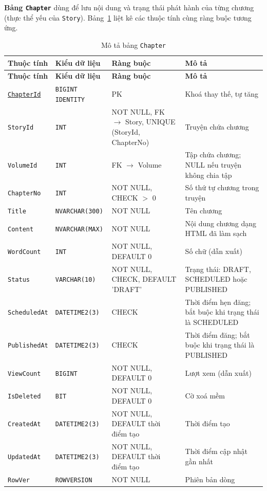 \textbf{Bảng \texttt{Chapter}} dùng để lưu nội dung và trạng thái phát hành của từng chương (thực thể yếu của \texttt{Story}). Bảng~\ref{tab:db-chapter} liệt kê các thuộc tính cùng ràng buộc tương ứng.


{\small
\renewcommand{\arraystretch}{1.2}
\begin{longtable}{|>{\raggedright\arraybackslash}p{3.1cm}|>{\raggedright\arraybackslash}p{2.7cm}|>{\raggedright\arraybackslash}p{4.0cm}|>{\raggedright\arraybackslash}p{5.4cm}|}
\caption{Mô tả bảng \texttt{Chapter}}\label{tab:db-chapter}\\
\hline
\textbf{Thuộc tính} & \textbf{Kiểu dữ liệu} & \textbf{Ràng buộc} & \textbf{Mô tả} \\ \hline
\endfirsthead
\hline
\textbf{Thuộc tính} & \textbf{Kiểu dữ liệu} & \textbf{Ràng buộc} & \textbf{Mô tả} \\ \hline
\endhead
\underline{\texttt{ChapterId}} & \texttt{BIGINT IDENTITY} & PK & Khoá thay thế, tự tăng \\ \hline
\texttt{StoryId} & \texttt{INT} & NOT NULL, FK $\rightarrow$ Story, UNIQUE (StoryId, ChapterNo) & Truyện chứa chương \\ \hline
\texttt{VolumeId} & \texttt{INT} & FK $\rightarrow$ Volume & Tập chứa chương; NULL nếu truyện không chia tập \\ \hline
\texttt{ChapterNo} & \texttt{INT} & NOT NULL, CHECK $>$ 0 & Số thứ tự chương trong truyện \\ \hline
\texttt{Title} & \texttt{NVARCHAR(300)} & NOT NULL & Tên chương \\ \hline
\texttt{Content} & \texttt{NVARCHAR(MAX)} & NOT NULL & Nội dung chương dạng HTML đã làm sạch \\ \hline
\texttt{WordCount} & \texttt{INT} & NOT NULL, DEFAULT 0 & Số chữ (dẫn xuất) \\ \hline
\texttt{Status} & \texttt{VARCHAR(10)} & NOT NULL, CHECK, DEFAULT 'DRAFT' & Trạng thái: DRAFT, SCHEDULED hoặc PUBLISHED \\ \hline
\texttt{ScheduledAt} & \texttt{DATETIME2(3)} & CHECK & Thời điểm hẹn đăng; bắt buộc khi trạng thái là SCHEDULED \\ \hline
\texttt{PublishedAt} & \texttt{DATETIME2(3)} & CHECK & Thời điểm đăng; bắt buộc khi trạng thái là PUBLISHED \\ \hline
\texttt{ViewCount} & \texttt{BIGINT} & NOT NULL, DEFAULT 0 & Lượt xem (dẫn xuất) \\ \hline
\texttt{IsDeleted} & \texttt{BIT} & NOT NULL, DEFAULT 0 & Cờ xoá mềm \\ \hline
\texttt{CreatedAt} & \texttt{DATETIME2(3)} & NOT NULL, DEFAULT thời điểm tạo & Thời điểm tạo \\ \hline
\texttt{UpdatedAt} & \texttt{DATETIME2(3)} & NOT NULL, DEFAULT thời điểm tạo & Thời điểm cập nhật gần nhất \\ \hline
\texttt{RowVer} & \texttt{ROWVERSION} & NOT NULL & Phiên bản dòng \\ \hline
\end{longtable}
}

